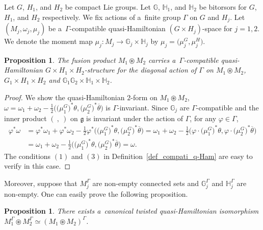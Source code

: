 \documentclass[pdftex]{sigma}
\numberwithin{equation}{section}
\newtheorem{Proposition}[Theorem]{Proposition}
\theoremstyle{definition}
\newcommand{\bG}{\mathbb{G}}
\newcommand{\bH}{\mathbb{H}}
\begin{document}
Let $G$, $H_1$, and $H_2$ be compact Lie groups.
Let $\bG$, $\bH_1$, and $\bH_2$ be bitorsors for $G$, $H_1$, and $H_2$ respectively.
We fix actions of a~finite group $\Gamma$ on $G$ and $H_j$.
Let $(M_j, \omega_j, \mu_j)$ be a~$\Gamma$-compatible quasi-Hamiltonian $(G\times H_j)$-space for $j=1,2$.
We denote the moment map $\mu_j \colon M_j \to \bG_j \times \bH_j$ by $\mu_j =\bigl(\mu^{G}_j,\mu^{H}_j\bigr)$.

\begin{Proposition}
 The fusion product $M_1 \circledast M_2$ carries a~$\Gamma$-compatible quasi-Hamiltonian $G \times H_1 \times H_2$-structure for the diagonal action of $\Gamma$ on $M_1 \circledast M_2$, $G_1 \times H_1 \times H_2$ and $\bG_1 \bG_2 \times \bH_1 \times \bH_2$.
\end{Proposition}

\begin{proof}
 We show the quasi-Hamiltonian $2$-form on $M_1 \circledast M_2$, $\omega = \omega_1 + \omega_2 - \frac{1}{2}\bigl(\bigl(\mu_1^{G}\bigr)^*\theta, \bigl(\mu_2^{G}\bigr)^* \overline{\theta}\bigr)$
 is $\Gamma$-invariant. Since $\bG_j$ are $\Gamma$-compatible and the inner product $(\ ,\ )$ on $\mathfrak{g}$ is invariant under the action of $\Gamma$, for any $\varphi \in \Gamma$,
 \begin{align*}
 \varphi^*\omega &= \varphi ^* \omega_1 + \varphi ^* \omega_2 -\frac{1}{2}\varphi^*\bigl(\bigl(\mu_1^G\bigr)^*\theta,\bigl(\mu_2^G\bigr)^*\overline{\theta}\bigr) = \omega_1 + \omega_2 -\frac{1}{2}\bigl(\varphi \cdot \bigl(\mu_1^G\bigr)^*\theta, \varphi \cdot \bigl(\mu_2^G\bigr)^* \overline{\theta}\bigr) \\
 &= \omega_1 + \omega_2 -\frac{1}{2}\bigl(\bigl(\mu_1^G\bigr)^*\theta, \bigl(\mu_2^G\bigr)^* \overline{\theta}\bigr) = \omega.
 \end{align*}
 The conditions $(1)$ and $(3)$ in Definition~\ref{def_compati_q-Ham} are easy to verify in this case.
\end{proof}

Moreover, suppose that $M_j^{\Gamma}$ are non-empty connected sets and $\bG_j^{\Gamma}$ and $\bH_j^{\Gamma}$ are non-empty.
One can easily prove the following proposition.

\begin{Proposition}\label{fusion_and_fixedpoints}
 There exists a~canonical twisted quasi-Hamiltonian isomorphism $M_1^{\Gamma} \circledast M_2^{\Gamma} \simeq (M_1 \circledast M_2)^{\Gamma}$.
\end{Proposition}
\end{document}
